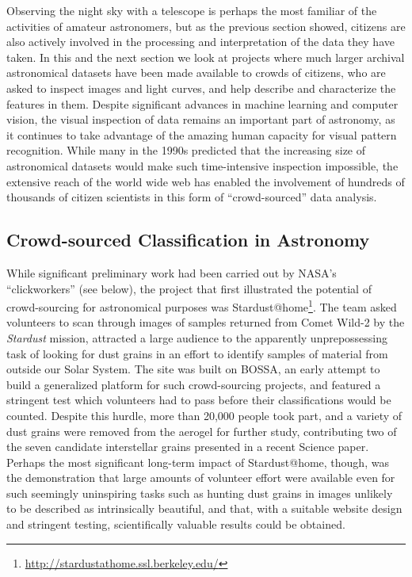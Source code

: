 \documentclass{ar2e}
\begin{document}
Observing the night sky with a telescope is perhaps the most familiar of the
activities of amateur astronomers, but as the previous section showed, citizens
are also actively involved in the processing and interpretation of the data they
have taken.  In this and the next section we look at projects where much larger
archival astronomical datasets have been made available to crowds of citizens,
who are asked to inspect images and light curves, and help describe and
characterize the features in them. Despite significant advances in machine
learning and computer vision, the visual inspection of data remains an important
part of astronomy, as it continues to take advantage of the amazing human
capacity for visual pattern recognition. While many in the 1990s predicted that
the increasing size of astronomical datasets would make such time-intensive
inspection impossible, the extensive reach of the world wide web has enabled the
involvement of hundreds of thousands of citizen scientists in this form of
``crowd-sourced'' data analysis. 


\subsection{Crowd-sourced Classification in Astronomy}
\label{sec:class:astro}

While significant preliminary work had been carried out by NASA's
``clickworkers'' (see below), the project that first illustrated the potential
of crowd-sourcing for astronomical purposes was 
Stardust@home\footnote{\url{http://stardustathome.ssl.berkeley.edu/}}. The team
asked volunteers to scan through images of samples returned from Comet Wild-2 by
the \emph{Stardust} mission, attracted a large audience to the apparently
unprepossessing task of looking for dust grains in an effort to identify samples
of material from outside our Solar System. The site was built on BOSSA, an early
attempt to build a generalized platform for such crowd-sourcing projects, and
featured a stringent test which volunteers had to pass before their
classifications would be counted. Despite this hurdle, more than 20,000 people
took part, and a variety of dust grains were removed from the aerogel for
further study, contributing two of the seven candidate interstellar grains presented in a recent Science paper\citep{Westphal}. Perhaps the most significant long-term impact of
Stardust@home, though, was the demonstration that large amounts of volunteer
effort were available even for such seemingly uninspiring tasks such as hunting
dust grains in images unlikely to be described as intrinsically beautiful, and
that, with a suitable website design and stringent testing, scientifically
valuable results could be obtained. 
\end{document}
